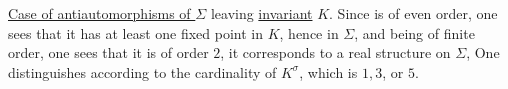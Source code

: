 \uline{Case of antiautomorphisms of \(\Sigma\)} \inserted{\(\sigma\)} leaving \uline{invariant} \(K\).  Since  is of even order, one sees that it  has at least one fixed point in \(K\), hence in \(\Sigma\), and being of finite order, one sees that it is of order \(2\), it corresponds to a real structure on \(\Sigma\), 
One distinguishes according to the cardinality of \(K^\sigma\), which is \(1,3\), or \(5\).
